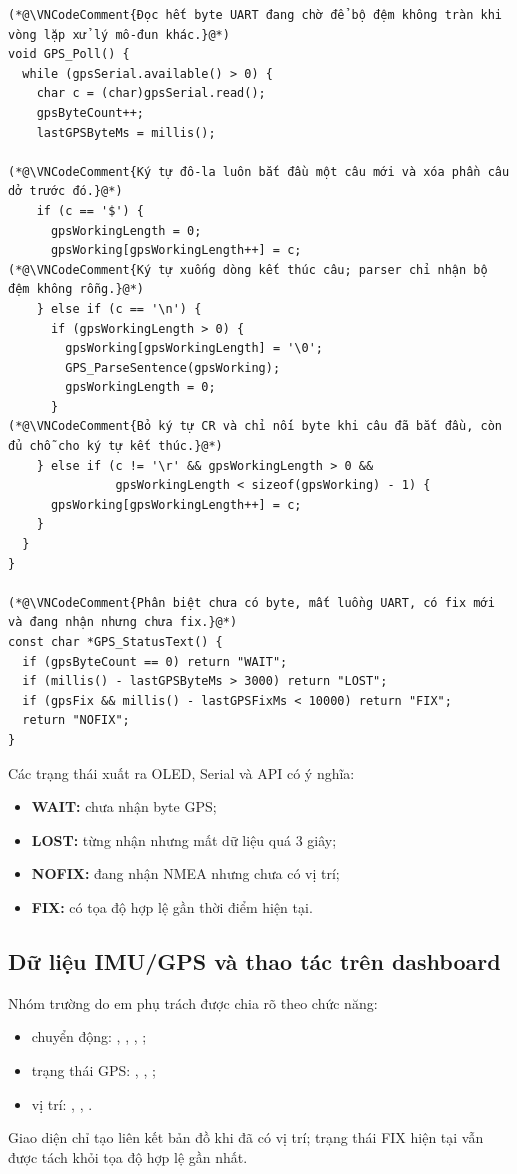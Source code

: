 \documentclass[12pt]{article}
\begin{document}
\begin{lstlisting}[style=firmware,caption={Gom câu NMEA từ UART và phân loại trạng thái GPS}]
(*@\VNCodeComment{Đọc hết byte UART đang chờ để bộ đệm không tràn khi vòng lặp xử lý mô-đun khác.}@*)
void GPS_Poll() {
  while (gpsSerial.available() > 0) {
    char c = (char)gpsSerial.read();
    gpsByteCount++;
    lastGPSByteMs = millis();

(*@\VNCodeComment{Ký tự đô-la luôn bắt đầu một câu mới và xóa phần câu dở trước đó.}@*)
    if (c == '$') {
      gpsWorkingLength = 0;
      gpsWorking[gpsWorkingLength++] = c;
(*@\VNCodeComment{Ký tự xuống dòng kết thúc câu; parser chỉ nhận bộ đệm không rỗng.}@*)
    } else if (c == '\n') {
      if (gpsWorkingLength > 0) {
        gpsWorking[gpsWorkingLength] = '\0';
        GPS_ParseSentence(gpsWorking);
        gpsWorkingLength = 0;
      }
(*@\VNCodeComment{Bỏ ký tự CR và chỉ nối byte khi câu đã bắt đầu, còn đủ chỗ cho ký tự kết thúc.}@*)
    } else if (c != '\r' && gpsWorkingLength > 0 &&
               gpsWorkingLength < sizeof(gpsWorking) - 1) {
      gpsWorking[gpsWorkingLength++] = c;
    }
  }
}

(*@\VNCodeComment{Phân biệt chưa có byte, mất luồng UART, có fix mới và đang nhận nhưng chưa fix.}@*)
const char *GPS_StatusText() {
  if (gpsByteCount == 0) return "WAIT";
  if (millis() - lastGPSByteMs > 3000) return "LOST";
  if (gpsFix && millis() - lastGPSFixMs < 10000) return "FIX";
  return "NOFIX";
}
\end{lstlisting}

Các trạng thái xuất ra OLED, Serial và API có ý nghĩa:

\begin{itemize}
  \item \textbf{WAIT:} chưa nhận byte GPS;
  \item \textbf{LOST:} từng nhận nhưng mất dữ liệu quá 3 giây;
  \item \textbf{NOFIX:} đang nhận NMEA nhưng chưa có vị trí;
  \item \textbf{FIX:} có tọa độ hợp lệ gần thời điểm hiện tại.
\end{itemize}

\subsection{Dữ liệu IMU/GPS và thao tác trên dashboard}

Nhóm trường do em phụ trách được chia rõ theo chức năng:
\begin{itemize}
  \item chuyển động: , , , ;
  \item trạng thái GPS: , , ;
  \item vị trí: , , .
\end{itemize}
Giao diện chỉ tạo liên kết bản đồ khi đã có vị trí; trạng thái FIX hiện tại vẫn được tách khỏi tọa độ hợp lệ gần nhất.
\end{document}
